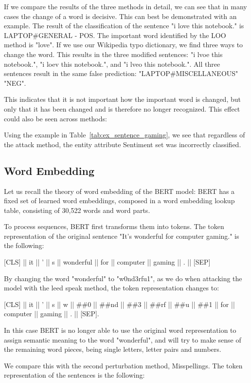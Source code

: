 If we compare the results of the three methods in detail, we can see that in many cases the change of a word is decisive. 
This can best be demonstrated with an example. 
The result of the classification of the sentence "i love this notebook." is LAPTOP\#GENERAL - POS. The important word identified by the LOO method is "love". If we use our Wikipedia typo dictionary, we find three ways to change the word. This results in the three modified sentences: "i lvoe this notebook.", "i loev this notebook.", and "i lveo this notebook.".
All three sentences result in the same false prediction:
"LAPTOP\#MISCELLANEOUS" "NEG".

This indicates that it is not important how the important word is changed, but only that it has been changed and is therefore no longer recognized.
This effect could also be seen across methods:

Using the example in Table~\ref{tab:ex_sentence_gaming}, we see that regardless of the attack method, the entity attribute Sentiment set was incorrectly classified. 


\subsection{Word Embedding}
Let us recall the theory of word embedding of the BERT model:
BERT has a fixed set of learned word embeddings, composed in a word embedding lookup table, consisting of 30,522 words and word parts. 

To process sequences, BERT first transforms them into tokens. The token representation of the original sentence "It’s wonderful for computer gaming." is the following:


{[}CLS{]}  ||  it  ||  '  ||  s  ||  wonderful  ||  for  ||  computer  ||  gaming  ||  .  ||  {[}SEP{]} 


By changing the word "wonderful" to "w0nd3rfu1", as we do when attacking the model with the leed speak method, the token representation changes to:

{[}CLS{]}  ||  it  ||  '  ||  s  ||  w  ||  \#\#0  ||  \#\#nd  ||  \#\#3  ||  \#\#rf  ||  \#\#u  ||  \#\#1  ||  for  ||  computer  ||  gaming  ||  .  ||  {[}SEP{]}.

In this case BERT is no longer able to use the original word representation to assign semantic meaning to the word "wonderful", and will try to make sense of the remaining word pieces, being single letters, letter pairs and numbers.

We compare this with the second perturbation method, Misspellings. The token representation of the sentences is the following:

